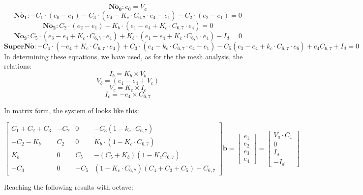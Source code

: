 \begin{equation*}
  \mathbf{N\acute{o}_0} : e_0 = V_a
  \label{eq:kcl0}
\end{equation*}
\begin{equation*}
  \mathbf{N\acute{o}_1} : -C_1 \cdot (e_0 - e_1) - C_3 \cdot (e_4 - K_c \cdot C_{6,7} \cdot e_4 - e_1) - C_2 \cdot (e_2 - e_1) = 0
  \label{eq:kcl1}
\end{equation*}
\begin{equation*}
  \mathbf{N\acute{o}_2} : C_2 \cdot (e_2 - e_1) - K_b \cdot (e_1 - e_4 + K_c \cdot C_{6,7} \cdot e_4) = 0
  \label{eq:kcl2}
\end{equation*}
\begin{equation*}
  \mathbf{N\acute{o}_3} : C_5 \cdot (e_3 - e_4 + K_c \cdot C_{6,7} \cdot e_4) + K_b \cdot (e_1 - e_4 + K_c \cdot C_{6,7} \cdot e_4) - I_d = 0
  \label{eq:kcl3}
\end{equation*}
\begin{equation*}
    \mathbf{SuperN\acute{o}} : -C_4 \cdot (-e_4 + K_c \cdot C_{6,7} \cdot e_4) + C_3 \cdot (e_4 - k_c \cdot C_{6,7} \cdot e_4 - e_1) - C_5 (e_3 - e_4 + k_c \cdot C_{6,7} \cdot e_6) + e_4 C_{6,7} + I_d = 0
\end{equation*}
In determining these equations, we have used, as for the the mesh analysis, the relations:
\begin{equation*}
    I_b = K_b \times V_b
\end{equation*}
\begin{equation*}
    V_b = (e_1 - e_4 + V_c)
\end{equation*}
\begin{equation*}
    V_c = K_c \times I_c
\end{equation*}
\begin{equation*}
    I_c = -e_4 \times C_{6,7}
\end{equation*}

In matrix form, the system of looks like this:
\vspace{10mm}


$\begin{bmatrix}
C_1 + C_2 + C_3  &  -C_2                 &  0        &  -C_3(1-k_c \cdot C_{6,7}) \\
-C_2 - K_b        &  C_2      &  0           &  K_b \cdot (1 - K_c \cdot C_{6,7}) \\
K_b             & 0                     &  C_5
&  -(C_5 + K_b)(1 - K_c C_{6,7}) \\
-C_3 & 0 & -C_5 & (1-K_c \cdot C_{6,7})(C_4 + C_3 + C_5) + C_{6,7}
\end{bmatrix}
\textbf{b} =
\begin{bmatrix}
e_1 \\
e_2 \\
e_3 \\
e_4
\end{bmatrix}
=
\begin{bmatrix}
V_a \cdot C_1 \\
0 \\
I_d \\
-I_d
\end{bmatrix}$

\vspace{10mm}


Reaching the following results with octave:
 